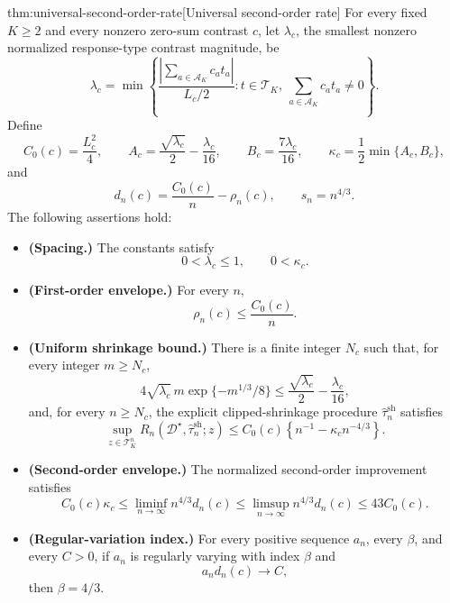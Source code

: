 \begin{theoremv}{thm:universal-second-order-rate}[Universal second-order rate]
For every fixed \(K\geq 2\) and every nonzero zero-sum contrast \(c\), let \(\lambda_c\), the smallest nonzero normalized response-type contrast magnitude, be
\[
\lambda_c
=
\min\left\{
\frac{\left|\sum_{a\in\mathcal A_K} c_a t_a\right|}{L_c/2}
:
t\in\mathcal T_K,\ 
\sum_{a\in\mathcal A_K} c_a t_a\neq 0
\right\}.
\]
Define
\[
C_0(c)=\frac{L_c^2}{4},
\qquad
A_c=\frac{\sqrt{\lambda_c}}{2}-\frac{\lambda_c}{16},
\qquad
B_c=\frac{7\lambda_c}{16},
\qquad
\kappa_c=\frac{1}{2}\min\{A_c,B_c\},
\]
and
\[
d_n(c)=\frac{C_0(c)}{n}-\rho_n(c),
\qquad
s_n=n^{4/3}.
\]
The following assertions hold:
\begin{itemize}
\item \textbf{(Spacing.)} The constants satisfy
\[
0<\lambda_c\leq 1,
\qquad
0<\kappa_c.
\]

\item \textbf{(First-order envelope.)} For every \(n\),
\[
\rho_n(c)\leq \frac{C_0(c)}{n}.
\]

\item \textbf{(Uniform shrinkage bound.)} There is a finite integer \(N_c\) such that, for every integer \(m\geq N_c\),
\[
4\sqrt{\lambda_c}\,m\exp\{-m^{1/3}/8\}
\leq
\frac{\sqrt{\lambda_c}}{2}-\frac{\lambda_c}{16},
\]
and, for every \(n\geq N_c\), the explicit clipped-shrinkage procedure \(\widehat\tau_n^{\mathrm{sh}}\) satisfies
\[
\sup_{z\in\mathcal T_K^n}
R_n(\mathcal D^\star,\widehat\tau_n^{\mathrm{sh}};z)
\leq
C_0(c)\left\{n^{-1}-\kappa_c n^{-4/3}\right\}.
\]

\item \textbf{(Second-order envelope.)} The normalized second-order improvement satisfies
\[
C_0(c)\kappa_c
\leq
\liminf_{n\to\infty} n^{4/3}d_n(c)
\leq
\limsup_{n\to\infty} n^{4/3}d_n(c)
\leq
43C_0(c).
\]

\item \textbf{(Regular-variation index.)} For every positive sequence \(a_n\), every \(\beta\), and every \(C>0\), if \(a_n\) is regularly varying with index \(\beta\) and
\[
a_n d_n(c)\to C,
\]
then \(\beta=4/3\).
\end{itemize}
\end{theoremv}

